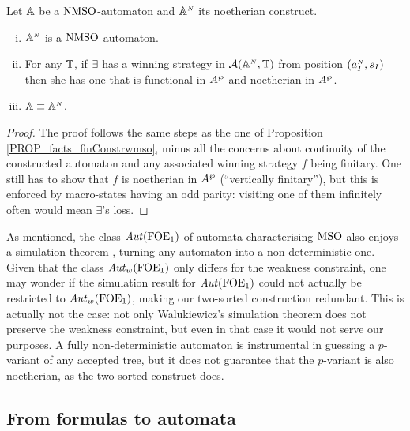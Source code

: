 \begin{theorem}\label{PROP_facts_noetConstr} Let $\mathbb{A}$ be a $\mathrm{NMSO}$-automaton and $\mathbb{A}^{{\scriptscriptstyle N}}$ its noetherian construct.
\begin{enumerate}[(i)]
   pt
  \item $\mathbb{A}^{{\scriptscriptstyle N}}$ is a $\mathrm{NMSO}$-automaton.\label{point:finConstrAut}
  \item For any $\mathbb{T}$, if $\exists$ has a winning strategy in $\mathcal{A}(\mathbb{A}^{{\scriptscriptstyle N}},\mathbb{T})$ from position $(a_I^{{\scriptscriptstyle N}},s_I)$ then she has one that is functional in $A^{\wp}$ and noetherian in $A^{\wp}$.%
  \label{point:finConstrStrategy}
  \item $\mathbb{A} \equiv \mathbb{A}^{{\scriptscriptstyle N}}$. \label{point:finConstrEquiv}
  \end{enumerate}
\end{theorem}
\begin{proof}
The proof follows the same steps as the one of Proposition \ref{PROP_facts_finConstrwmso}, minus all the concerns about continuity of the constructed automaton and any associated winning strategy $f$ being finitary. One still has to show that $f$ is noetherian in $A^{\wp}$ (``vertically finitary''), but this is enforced by macro-states having an odd parity: visiting one of them infinitely often would mean $\exists$'s loss.
\end{proof}

\begin{remark}
As mentioned, the class $\mathit{Aut}(\mathrm{FOE}_1)$ of automata characterising $\mathrm{MSO}$ \cite{Jan96} also enjoys a simulation theorem \cite{Walukiewicz96}, turning any automaton into a non-deterministic one. Given that the class $\mathit{Aut}_{w}(\mathrm{FOE}_1)$ only differs for the weakness constraint, one may wonder if the simulation result for $\mathit{Aut}(\mathrm{FOE}_1)$ could not actually be restricted to $\mathit{Aut}_{w}(\mathrm{FOE}_1)$, making our two-sorted construction redundant. This is actually not the case: not only Walukiewicz's simulation theorem \cite{Walukiewicz96} does not preserve the weakness constraint, but even in that case it would not serve our purposes. A fully non-deterministic automaton is instrumental in guessing a $p$-variant of any accepted tree, but it does not guarantee that the $p$-variant is also noetherian, as the two-sorted construct does.
\end{remark}

\subsection{From formulas to automata}

